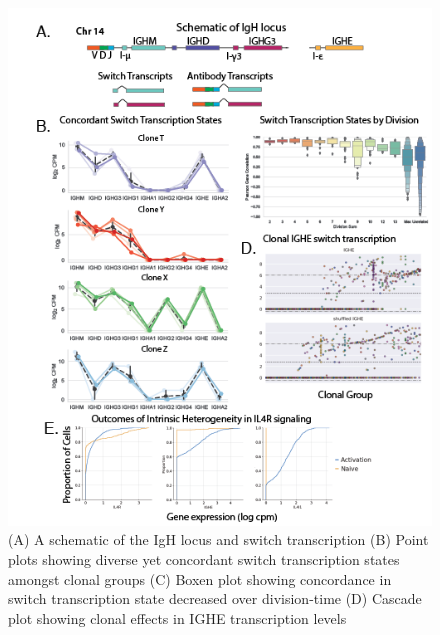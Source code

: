 \begin{figure}[hbt!]
\centering
\includegraphics[width=14cm, keepaspectratio]{figs/prelim_paper2/BCellLineagePaper_Figure 3.png}
\caption[Concordant Switch Transcription States amongst related cells]{(A) A schematic of the IgH locus and switch transcription (B) Point plots showing diverse yet concordant switch transcription states amongst clonal groups (C) Boxen plot showing concordance in switch transcription state decreased over division-time (D) Cascade plot showing clonal effects in IGHE transcription levels}
\label{fig:paper2_prelimfig_3}
\end{figure}



